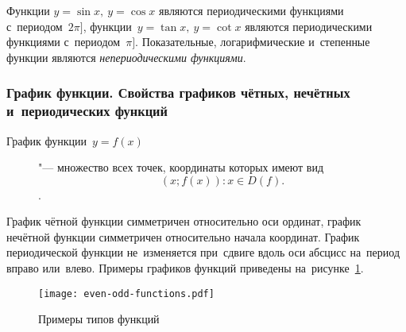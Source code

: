 \documentclass[]{scrartcl}
\begin{document}
{{Функции ${\textstyle y=\sin x,\ y=\cos x}$ являются периодическими функциями с~периодом~${\textstyle 2\pi]}$, функции~${\textstyle y=\tan x,\ y=\cot x}$   являются периодическими функциями с~периодом~${\textstyle \pi]}$. Показательные, логарифмические и~степенные функции являются \emph{непериодическими функциями}.

\subsubsection{График функции. Свойства графиков чётных, нечётных и~периодических функций}
\begin{description}
	\item[График функции~${\textstyle y=f(x)}$] "--- множество всех точек, координаты которых имеют вид
	\begin{equation}\label{eq:func-graph-coord}
	(x;f(x)):x\in D(f).
	\end{equation}.
\end{description}
График чётной функции симметричен относительно оси ординат, график нечётной функции симметричен относительно начала координат. График периодической функции не~изменяется при~сдвиге вдоль оси абсцисс на~период вправо или~влево. Примеры графиков функций приведены на~рисунке~\ref{fig:even-odd-functions}.

\begin{figure}[ht]
	\centering %
	\texttt{[image: even-odd-functions.pdf]}
	\caption{Примеры типов функций}\label{fig:even-odd-functions}
\end{figure}

}}
\end{document}
